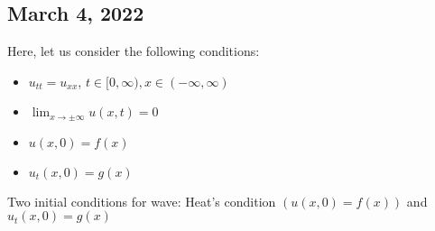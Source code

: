 \subsection*{March 4, 2022}


Here, let us consider the following conditions:
%
\begin{itemize}
  \item $u_{tt} = u_{xx}$, $t \in [0, \infty), x \in (-\infty, \infty)$
  \item $\displaystyle \lim_{x \to \pm \infty} u(x, t) = 0$
  \item $u(x, 0) = f(x)$
  \item $u_t(x, 0) = g(x)$
\end{itemize}

\note Two initial conditions for wave: Heat's condition $(u(x, 0) = f(x))$ and $u_t(x, 0) = g(x)$

